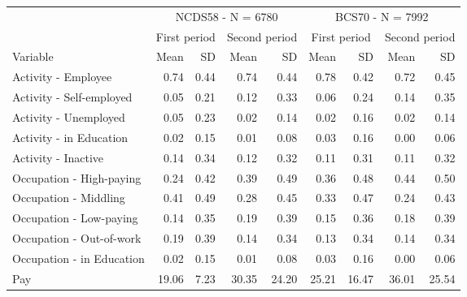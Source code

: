 
\begin{tabular}{lrrrrrrrr}
\toprule
\multicolumn{1}{c}{} & \multicolumn{4}{c}{NCDS58 - N = 6780} & \multicolumn{4}{c}{BCS70 - N = 7992} \\
\cmidrule(l{3pt}r{3pt}){2-5} \cmidrule(l{3pt}r{3pt}){6-9}
\multicolumn{1}{c}{} & \multicolumn{2}{c}{First period} & \multicolumn{2}{c}{Second period} & \multicolumn{2}{c}{First period} & \multicolumn{2}{c}{Second period} \\
\cmidrule(l{3pt}r{3pt}){2-3} \cmidrule(l{3pt}r{3pt}){4-5} \cmidrule(l{3pt}r{3pt}){6-7} \cmidrule(l{3pt}r{3pt}){8-9}
Variable & Mean & SD & Mean & SD & Mean & SD & Mean & SD\\
\midrule
Activity - Employee & 0.74 & 0.44 & 0.74 & 0.44 & 0.78 & 0.42 & 0.72 & 0.45\\
Activity - Self-employed & 0.05 & 0.21 & 0.12 & 0.33 & 0.06 & 0.24 & 0.14 & 0.35\\
Activity - Unemployed & 0.05 & 0.23 & 0.02 & 0.14 & 0.02 & 0.16 & 0.02 & 0.14\\
Activity - in Education & 0.02 & 0.15 & 0.01 & 0.08 & 0.03 & 0.16 & 0.00 & 0.06\\
Activity - Inactive & 0.14 & 0.34 & 0.12 & 0.32 & 0.11 & 0.31 & 0.11 & 0.32\\
Occupation - High-paying & 0.24 & 0.42 & 0.39 & 0.49 & 0.36 & 0.48 & 0.44 & 0.50\\
Occupation - Middling & 0.41 & 0.49 & 0.28 & 0.45 & 0.33 & 0.47 & 0.24 & 0.43\\
Occupation - Low-paying & 0.14 & 0.35 & 0.19 & 0.39 & 0.15 & 0.36 & 0.18 & 0.39\\
Occupation - Out-of-work & 0.19 & 0.39 & 0.14 & 0.34 & 0.13 & 0.34 & 0.14 & 0.34\\
Occupation - in Education & 0.02 & 0.15 & 0.01 & 0.08 & 0.03 & 0.16 & 0.00 & 0.06\\
Pay & 19.06 & 7.23 & 30.35 & 24.20 & 25.21 & 16.47 & 36.01 & 25.54\\
\bottomrule
\end{tabular}
